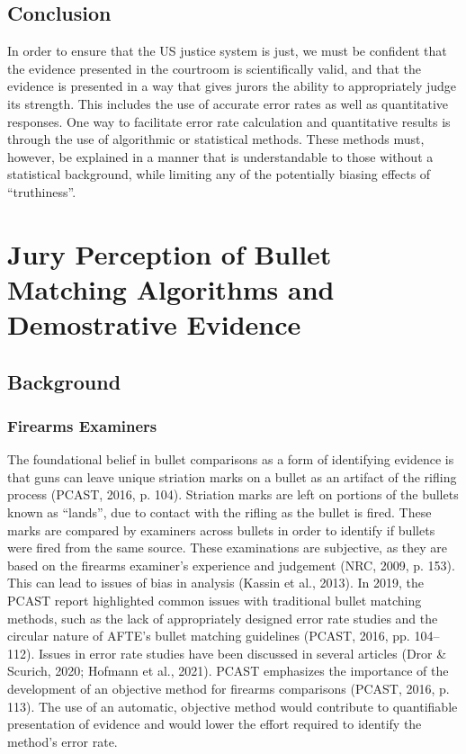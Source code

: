 \documentclass[print]{nuthesis}
\begin{document}
\hypertarget{conclusion}{%
\section{Conclusion}\label{conclusion}}

In order to ensure that the US justice system is just, we must be confident that the evidence presented in the courtroom is scientifically valid, and that the evidence is presented in a way that gives jurors the ability to appropriately judge its strength.
This includes the use of accurate error rates as well as quantitative responses.
One way to facilitate error rate calculation and quantitative results is through the use of algorithmic or statistical methods.
These methods must, however, be explained in a manner that is understandable to those without a statistical background, while limiting any of the potentially biasing effects of ``truthiness''.

\hypertarget{study1}{%
\chapter{Jury Perception of Bullet Matching Algorithms and Demostrative Evidence}\label{study1}}

\hypertarget{background}{%
\section{Background}\label{background}}

\hypertarget{firearms-examiners}{%
\subsection{Firearms Examiners}\label{firearms-examiners}}

The foundational belief in bullet comparisons as a form of identifying evidence is that guns can leave unique striation marks on a bullet as an artifact of the rifling process (PCAST, 2016, p. 104).
Striation marks are left on portions of the bullets known as ``lands'', due to contact with the rifling as the bullet is fired.
These marks are compared by examiners across bullets in order to identify if bullets were fired from the same source.
These examinations are subjective, as they are based on the firearms examiner's experience and judgement (NRC, 2009, p. 153).
This can lead to issues of bias in analysis (Kassin et al., 2013). In 2019, the PCAST report highlighted common issues with traditional bullet matching methods, such as the lack of appropriately designed error rate studies and the circular nature of AFTE's bullet matching guidelines (PCAST, 2016, pp. 104--112).
Issues in error rate studies have been discussed in several articles (Dror \& Scurich, 2020; Hofmann et al., 2021).
PCAST emphasizes the importance of the development of an objective method for firearms comparisons (PCAST, 2016, p. 113).
The use of an automatic, objective method would contribute to quantifiable presentation of evidence and would lower the effort required to identify the method's error rate.
\end{document}
